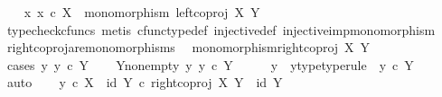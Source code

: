 \begin{isabellebody}
\isamarkupfalse%
\isanewline
\ \ \isamarkupfalse%
\ {\isachardoublequoteopen}{\isasymnexists}x{\isachardot}{\kern0pt}\ x\ {\isasymin}\isactrlsub c\ X\ {\isasymLongrightarrow}\ monomorphism\ {\isacharparenleft}{\kern0pt}left{\isacharunderscore}{\kern0pt}coproj\ X\ Y{\isacharparenright}{\kern0pt}{\isachardoublequoteclose}\isanewline
\ \ \ \ \isamarkupfalse%
\ {\isacharparenleft}{\kern0pt}typecheck{\isacharunderscore}{\kern0pt}cfuncs{\isacharcomma}{\kern0pt}\ metis\ cfunc{\isacharunderscore}{\kern0pt}type{\isacharunderscore}{\kern0pt}def\ injective{\isacharunderscore}{\kern0pt}def\ injective{\isacharunderscore}{\kern0pt}imp{\isacharunderscore}{\kern0pt}monomorphism{\isacharparenright}{\kern0pt}\isanewline
{}\isamarkupfalse%
%
\endisatagproof
{\isafoldproof}%
%
\isadelimproof
\isanewline
%
\endisadelimproof
\isanewline
{}\isamarkupfalse%
\ right{\isacharunderscore}{\kern0pt}coproj{\isacharunderscore}{\kern0pt}are{\isacharunderscore}{\kern0pt}monomorphisms{\isacharcolon}{\kern0pt}\isanewline
\ \ {\isachardoublequoteopen}monomorphism{\isacharparenleft}{\kern0pt}right{\isacharunderscore}{\kern0pt}coproj\ X\ Y{\isacharparenright}{\kern0pt}{\isachardoublequoteclose}\isanewline
%
\isadelimproof
%
\endisadelimproof
%
\isatagproof
{}\isamarkupfalse%
\ {\isacharparenleft}{\kern0pt}cases\ {\isachardoublequoteopen}{\isasymexists}y{\isachardot}{\kern0pt}\ y\ {\isasymin}\isactrlsub c\ Y{\isachardoublequoteclose}{\isacharparenright}{\kern0pt}\isanewline
\ \ \isamarkupfalse%
\ Y{\isacharunderscore}{\kern0pt}nonempty{\isacharcolon}{\kern0pt}\ {\isachardoublequoteopen}{\isasymexists}y{\isachardot}{\kern0pt}\ y\ {\isasymin}\isactrlsub c\ Y{\isachardoublequoteclose}\isanewline
\ \ \isamarkupfalse%
\ \isamarkupfalse%
\ y\ \ y{\isacharunderscore}{\kern0pt}type{\isacharbrackleft}{\kern0pt}type{\isacharunderscore}{\kern0pt}rule{\isacharbrackright}{\kern0pt}{\isacharcolon}{\kern0pt}\ \ {\isachardoublequoteopen}y\ {\isasymin}\isactrlsub c\ Y{\isachardoublequoteclose}\isanewline
\ \ \ \ \isamarkupfalse%
\ auto\isanewline
\ \ \isamarkupfalse%
\ {\isachardoublequoteopen}{\isacharparenleft}{\kern0pt}{\isacharparenleft}{\kern0pt}y\ {\isasymcirc}\isactrlsub c\ {\isasymbeta}\isactrlbsub X\isactrlesub {\isacharparenright}{\kern0pt}\ {\isasymamalg}\ id\ Y{\isacharparenright}{\kern0pt}\ {\isasymcirc}\isactrlsub c\ right{\isacharunderscore}{\kern0pt}coproj\ X\ Y\ {\isacharequal}{\kern0pt}\ id\ Y{\isachardoublequoteclose}\isanewline

\end{isabellebody}
